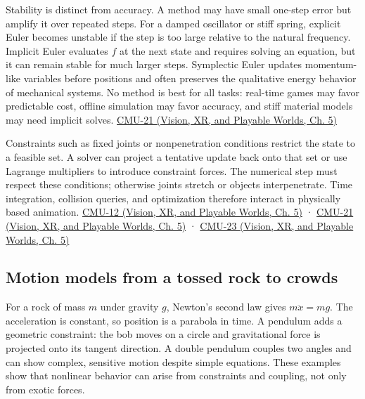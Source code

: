 Stability is distinct from accuracy. A method may have small one-step error but amplify it over repeated steps. For a damped oscillator or stiff spring, explicit Euler becomes unstable if the step is too large relative to the natural frequency. Implicit Euler evaluates \(f\) at the next state and requires solving an equation, but it can remain stable for much larger steps. Symplectic Euler updates momentum-like variables before positions and often preserves the qualitative energy behavior of mechanical systems. No method is best for all tasks: real-time games may favor predictable cost, offline simulation may favor accuracy, and stiff material models may need implicit solves. \href{../07-Vision-XR-and-Playable-Worlds/main.pdf\#nameddest=04-visual-computing-ii-ch036-cmu-21---dynamics-and-time-integration}{CMU-21 (Vision, XR, and Playable Worlds, Ch. 5)}

Constraints such as fixed joints or nonpenetration conditions restrict the state to a feasible set. A solver can project a tentative update back onto that set or use Lagrange multipliers to introduce constraint forces. The numerical step must respect these conditions; otherwise joints stretch or objects interpenetrate. Time integration, collision queries, and optimization therefore interact in physically based animation. \href{../07-Vision-XR-and-Playable-Worlds/main.pdf\#nameddest=04-visual-computing-ii-ch036-cmu-12---geometric-queries}{CMU-12 (Vision, XR, and Playable Worlds, Ch. 5)} · \href{../07-Vision-XR-and-Playable-Worlds/main.pdf\#nameddest=04-visual-computing-ii-ch036-cmu-21---dynamics-and-time-integration}{CMU-21 (Vision, XR, and Playable Worlds, Ch. 5)} · \href{../07-Vision-XR-and-Playable-Worlds/main.pdf\#nameddest=04-visual-computing-ii-ch036-cmu-23---physically-based-animation-and-pdes}{CMU-23 (Vision, XR, and Playable Worlds, Ch. 5)}

\subsection{Motion models from a tossed rock to crowds}\label{04-visual-computing-ii-ch029-motion-models-from-a-tossed-rock-to-crowds}

\hypertarget{04-visual-computing-ii-ch029-motion-models-from-a-tossed-rock-to-crowds}{}

For a rock of mass \(m\) under gravity \(g\), Newton's second law gives \(m\ddot x=mg\). The acceleration is constant, so position is a parabola in time. A pendulum adds a geometric constraint: the bob moves on a circle and gravitational force is projected onto its tangent direction. A double pendulum couples two angles and can show complex, sensitive motion despite simple equations. These examples show that nonlinear behavior can arise from constraints and coupling, not only from exotic forces.


